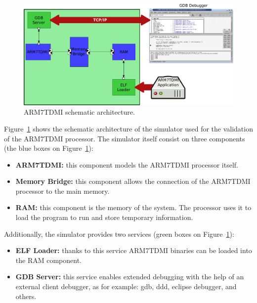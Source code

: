 \begin{figure}[!h]
	\begin{center}
		\includegraphics[width=\textwidth]{figures/ARM7TDMI_architecture.pdf}
	\end{center}
	\caption{ARM7TDMI schematic architecture.}
	\label{fig:arm7tdmi_architecture}
\end{figure}

Figure~\ref{fig:arm7tdmi_architecture} shows the schematic architecture of the simulator used for the validation of the ARM7TDMI processor.
The simulator itself consist on three components (the blue boxes on Figure~\ref{fig:arm7tdmi_architecture}):
\begin{itemize}
	\item \textbf{ARM7TDMI:} this component models the ARM7TDMI processor itself.
	\item \textbf{Memory Bridge:} this component allows the connection of the ARM7TDMI processor to the main memory.
	\item \textbf{RAM:} this component is the memory of the system. The processor uses it to load the program to run and store temporary information.
\end{itemize}

Additionally, the simulator provides two services (green boxes on Figure~\ref{fig:arm7tdmi_architecture}):
\begin{itemize}
	\item \textbf{ELF Loader:} thanks to this service ARM7TDMI binaries can be loaded into the RAM component.
	\item \textbf{GDB Server:} this service enables extended debugging with the help of an external client debugger, as for example: gdb, ddd, eclipse debugger, and others.
\end{itemize}
